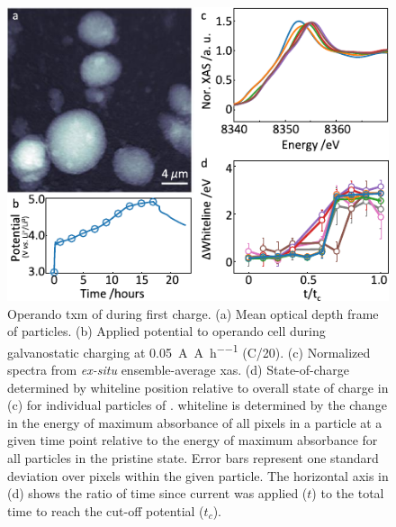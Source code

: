 \documentclass{WileyMSP-template}
\begin{document}
\newpage
\begin{figure}[!h]
  \includegraphics{figures/nca_txm.pdf}
  \caption{Operando \gls{txm} of \nca{} during first charge. (a) Mean
    optical depth frame of \nca{} particles. (b) Applied potential to
    operando cell during galvanostatic charging at
    \SI{0.05}{\ampere\per\ampere\per\hour} (C/20). (c) Normalized
    spectra from \emph{ex-situ} ensemble-average \gls{xas}. (d)
    State-of-charge determined by whiteline position relative to
    overall state of charge in (c) for individual particles of
    \nca{}. \textDelta{}whiteline is determined by the change in the
    energy of maximum absorbance of all pixels in a particle at a
    given time point relative to the energy of maximum absorbance for
    all particles in the pristine state. Error bars represent one
    standard deviation over pixels within the given particle. The
    horizontal axis in (d) shows the ratio of time since current was
    applied ($t$) to the total time to reach the cut-off potential
    ($t_c$).}
  \label{fig:txm-nca}
\end{figure}
\end{document}
